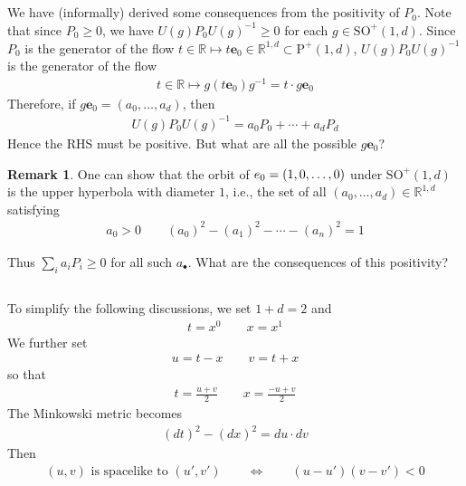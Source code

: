 \documentclass[12pt,b5paper,notitlepage]{article}
\theoremstyle{definition}
\newtheorem{rem}[df]{Remark}
\theoremstyle{plain}
\newcommand{\mbf}{\mathbf}
\newcommand{\blt}{\bullet}
\newcommand{\Rbb}{\mathbb R}
\newcommand{\Poid}{{\mathrm P}^+(1,d)}
\newcommand{\ebf}{\mathbf e}
\newcommand{\SO}{\mathrm{SO}}
\numberwithin{equation}{section}
\begin{document}
\subsection{}\label{lb2}


We have (informally) derived some consequences from the positivity of $P_0$.  Note that since $P_0\geq0$, we have $U(g)P_0U(g)^{-1}\geq0$ for each $g\in\SO^+(1,d)$. Since $P_0$ is the generator of the flow $t\in\Rbb\mapsto t\ebf_0\in\Rbb^{1,d}\subset\Poid$, $U(g)P_0U(g)^{-1}$ is the generator of the flow
\begin{align}
t\in\Rbb\mapsto g(t\ebf_0)g^{-1}=t\cdot g\ebf_0
\end{align}
Therefore, if $g\mbf e_0=(a_0,\dots,a_d)$, then
\begin{align}
U(g)P_0U(g)^{-1}=a_0P_0+\cdots+a_dP_d
\end{align}
Hence the RHS must be positive. But what are all the possible $g\ebf_0$?

\begin{rem}
One can show that the orbit of $\mbf \ebf_0=(1,0,\dots,0)$ under $\mathrm{SO}^+(1,d)$ is the upper hyperbola with diameter $1$, i.e., the set of all $(a_0,\dots,a_d)\in\Rbb^{1,d}$ satisfying
\begin{align}
a_0>0\qquad (a_0)^2-(a_1)^2-\cdots-(a_n)^2=1
\end{align}
\end{rem}

Thus $\sum_i a_iP_i\geq0$ for all such $a_\blt$. What are the consequences of this positivity?



\subsection{}\label{lb12}



To simplify the following discussions, we set $1+d=2$ and
\begin{align*}
t=x^0\qquad x=x^1
\end{align*}
We further set
\begin{align}
u=t-x\qquad v=t+x
\end{align}
so that
\begin{align}
t=\frac{u+v}2\qquad x=\frac{-u+v}2
\end{align}
The Minkowski metric becomes
\begin{align}
\boxed{~(dt)^2-(dx)^2=du\cdot dv~}
\end{align}
Then 
\begin{align}
(u,v)\text{ is spacelike to }(u',v')\qquad\Longleftrightarrow\qquad (u-u')(v-v')<0
\end{align}
\end{document}

